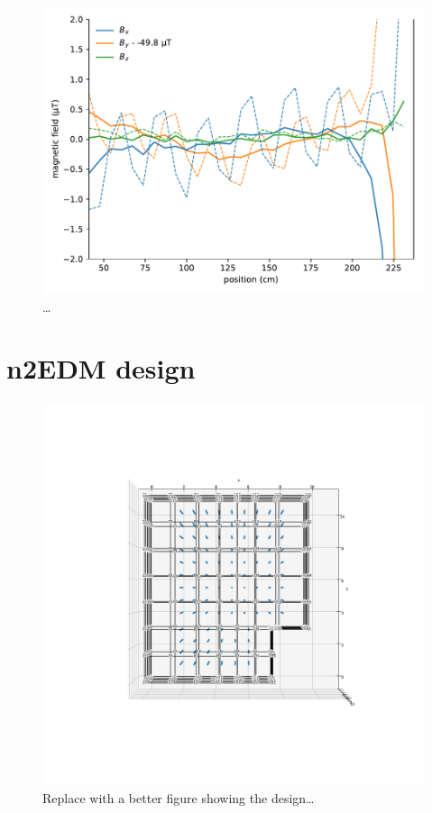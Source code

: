 \begin{figure}
  \centering
  \includegraphics[width=0.7\linewidth]{gfx/prototype/open_planar_map_Y_By_section.pdf}
  \caption{\ldots}
  \label{fig:prototype_open_design_Ycoil_map_section}
\end{figure}

\section{n2EDM design}

\begin{figure}
  \centering
  \includegraphics[width=\linewidth]{gfx/prototype/n2EDM_system_top.png}
  \caption{Replace with a better figure showing the design\ldots}
  \label{fig:n2EDM_design_top}
\end{figure}


